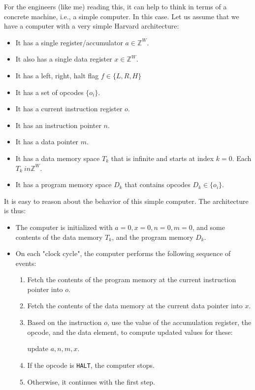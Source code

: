 

\iffalse
\begin{aside}
    For the engineers (like me) reading this, it can help to think in terms of a concrete
    machine, i.e., a simple computer.  In this case.  Let us assume that we have a
    computer with a very simple Harvard architecture:
    \begin{itemize}
        \item It has a single register/accumulator $a \in \mathbb{Z}^W$.
        \item It also has a single data register $x \in \mathbb{Z}^W$.
        \item It has a left, right, halt flag $f \in \{L, R, H\}$
        \item It has a set of opcodes $\{o_i\}$.
        \item It has a current instruction register $o$.
        \item It has an instruction pointer $n$.
        \item It has a data pointer $m$.
        \item It has a data memory space $T_k$ that is infinite and starts at index $k = 0$. Each
        $T_k \ in \mathbb{Z}^W$.
        \item It has a program memory space $D_k$ that contains opcodes $D_k \in \{o_i\}$.
    \end{itemize}

    It is easy to reason about the behavior of this simple computer.  The architecture is
    thus:
    \begin{itemize}
        \item The computer is initialized with $a = 0, x = 0, n = 0, m = 0$, and some contents of the data memory $T_k$,
        and the program memory $D_k$.
        \item On each "clock cycle", the computer performs the following sequence of events:
        \begin{enumerate}
            \item Fetch the contents of the program memory at the current instruction pointer into $o$.
            \item Fetch the contents of the data memory at the current data pointer into $x$.
            \item Based on the instruction $o$, use the value of the accumulation register, the opcode, and the data element, to compute updated values for these:

            update $a, n, m, x$.
            \item If the opcode is \verb|HALT|, the computer stops.
            \item Otherwise, it continues with the first step.
        \end{enumerate}
    \end{itemize}


\end{aside}
